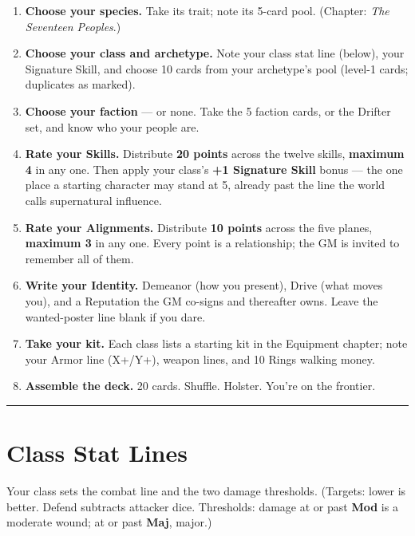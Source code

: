 \begin{enumerate}
    \item \textbf{Choose your species.} Take its trait; note its 5-card pool. (Chapter: \textit{The Seventeen Peoples}.)
    \item \textbf{Choose your class and archetype.} Note your class stat line (below), your Signature Skill, and choose 10 cards from your archetype's pool (level-1 cards; duplicates as marked).
    \item \textbf{Choose your faction} --- or none. Take the 5 faction cards, or the Drifter set, and know who your people are.
    \item \textbf{Rate your Skills.} Distribute \textbf{20 points} across the twelve skills, \textbf{maximum 4} in any one. Then apply your class's \textbf{+1 Signature Skill} bonus --- the one place a starting character may stand at 5, already past the line the world calls supernatural influence.
    \item \textbf{Rate your Alignments.} Distribute \textbf{10 points} across the five planes, \textbf{maximum 3} in any one. Every point is a relationship; the GM is invited to remember all of them.
    \item \textbf{Write your Identity.} Demeanor (how you present), Drive (what moves you), and a Reputation the GM co-signs and thereafter owns. Leave the wanted-poster line blank if you dare.
    \item \textbf{Take your kit.} Each class lists a starting kit in the Equipment chapter; note your Armor line (X+/Y+), weapon lines, and 10 Rings walking money.
    \item \textbf{Assemble the deck.} 20 cards. Shuffle. Holster. You're on the frontier.
\end{enumerate}

\medskip\hrule\medskip

\section{Class Stat Lines}

Your class sets the combat line and the two damage thresholds. (Targets: lower is better. Defend subtracts attacker dice. Thresholds: damage at or past \textbf{Mod} is a moderate wound; at or past \textbf{Maj}, major.)

